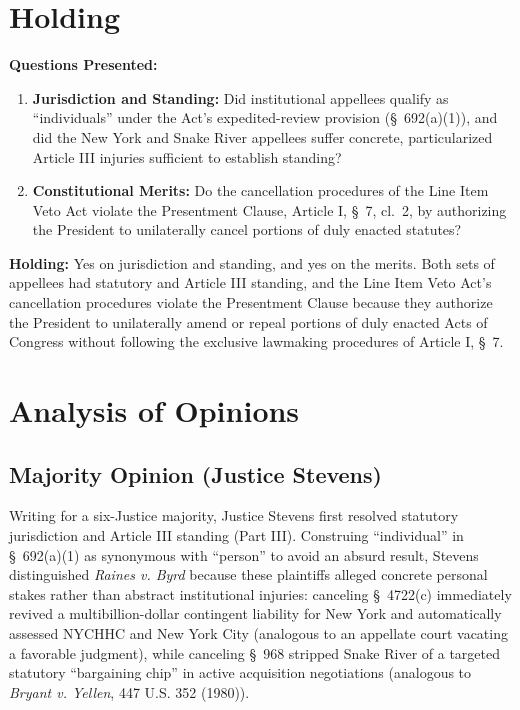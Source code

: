 \documentclass[12pt]{article}
\begin{document}
\section{Holding}
\textbf{Questions Presented:}

\begin{enumerate}
  \item \textbf{Jurisdiction and Standing:} Did institutional appellees qualify as ``individuals'' under the Act's expedited-review provision (\S~692(a)(1)), and did the New York and Snake River appellees suffer concrete, particularized Article III injuries sufficient to establish standing?
  \item \textbf{Constitutional Merits:} Do the cancellation procedures of the Line Item Veto Act violate the Presentment Clause, Article I, \S~7, cl.~2, by authorizing the President to unilaterally cancel portions of duly enacted statutes?
\end{enumerate}

\textbf{Holding:} Yes on jurisdiction and standing, and yes on the merits. Both sets of appellees had statutory and Article III standing, and the Line Item Veto Act's cancellation procedures violate the Presentment Clause because they authorize the President to unilaterally amend or repeal portions of duly enacted Acts of Congress without following the exclusive lawmaking procedures of Article I, \S~7.

\section{Analysis of Opinions}
\subsection{Majority Opinion (Justice Stevens)}

Writing for a six-Justice majority, Justice Stevens first resolved statutory jurisdiction and Article III standing (Part III). Construing ``individual'' in \S~692(a)(1) as synonymous with ``person'' to avoid an absurd result, Stevens distinguished \textit{Raines v. Byrd} because these plaintiffs alleged concrete personal stakes rather than abstract institutional injuries: canceling \S~4722(c) immediately revived a multibillion-dollar contingent liability for New York and automatically assessed NYCHHC and New York City (analogous to an appellate court vacating a favorable judgment), while canceling \S~968 stripped Snake River of a targeted statutory ``bargaining chip'' in active acquisition negotiations (analogous to \textit{Bryant v. Yellen}, 447 U.S. 352 (1980)).
\end{document}
